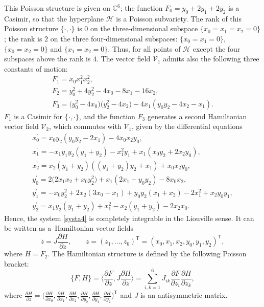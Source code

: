 \documentclass[pdftex]{sigma}
\numberwithin{equation}{section}
\begin{document}
This Poisson structure is given on $\mathbb{C}^6$; the function
$F_0=y_0 + 2y_1 + 2y_2$ is a Casimir, so that the hyperplane
$\mathcal{H}$ is a Poisson subvariety. The rank of this Poisson
structure $\{\cdot,\cdot\}$ is $0$ on the three-dimensional
subspace $\{x_0 = x_1 = x_2 = 0\}$; the rank is $2$ on the three
four-dimensional subspaces: $\{x_0 = x_1 = 0\}$, $\{x_0 = x_2 =
0\}$ and $\{x_1 = x_2 = 0\}$. Thus, for all points of
$\mathcal{H}$ except the four subspaces above the rank is $4$.
The vector field $\mathcal{V}_1$ admits also the following three
constants of motion:
\begin{gather}
 F_1=x_0x_1^2x_2^2, \nonumber\\
 F_2=y_0^2 + 4y_2^2-4x_0-8x_1-16x_2, \nonumber\\
 F_3= \bigl(y_0^2-4x_0\bigr)\bigl(y_2^2-4x_2\bigr)-4x_1(y_0y_2-4x_2-x_1).\label{invar1a4}
\end{gather}
$F_1$ is a Casimir for $\{\cdot,\cdot\}$, and the function
$F_3$ generates a second Hamiltonian vector field
$\mathcal{V}_2$, which commutes with $\mathcal{V}_1$, given by
the differential equations
\begin{gather}
x_0^{\prime}=x_0y_2(y_0y_2-2x_1)-4x_0x_2y_0, \nonumber\\
x_1^{\prime}=-x_1y_1y_2(y_1+y_2) - x_1^2y_1+x_1(x_0y_2+2x_2y_0), \nonumber\\
x_2^{\prime}=x_2(y_1+y_2)((y_1+y_2)y_2+x_1)+x_0x_2y_0, \nonumber\\
y_0^{\prime}=2\bigl(2x_1x_2+x_0y_2^2\bigr)+ x_1(2x_1-y_0y_2)-8x_0x_2, \nonumber\\
y_1^{\prime}=-x_0y_2^2+2x_2 ( 3x_0-x_1 ) +y_0y_2 (
x_1+x_2 )-2x_1^2+x_2y_0y_1, \nonumber\\
y_2^{\prime}=x_1y_2( y_1+y_2)+x_1^2-x_2( y_1+y_2)
-2x_2x_0. \label{syst3}
\end{gather}
Hence, the system \eqref{systa4} is completely integrable in the
Liouville sense. It can be written as a~Hamiltonian vector fields
\[\dot{z}=J\frac{\partial H}{\partial z},\qquad z=(z_1,\dots,z_6)^{\mathsf{T}}=( x_0
, x_1, x_2, y_0, y_1, y_2 )^{\mathsf{T}},\]
where $H=F_2$. The
Hamiltonian structure is defined by the following Poisson bracket:
\[ \{F,H\}=\biggl\langle\frac{\partial F}{\partial z}, J\frac{\partial H}
{\partial z}\biggr\rangle=\displaystyle\sum_{i,k=1}^6
J_{ik}\frac{\partial F}{\partial z_i}\frac{\partial H}{\partial
z_k},
\] where $\frac{\partial H}{\partial z}=\bigl(\frac{\partial
H}{\partial x_0},\frac{\partial H}{\partial x_1},\frac{\partial
H}{\partial x_2},\frac{\partial H}{\partial y_0},\frac{\partial
H}{\partial y_1},\frac{\partial H}{\partial y_2}\bigr)^{\mathsf{T}}$ and
$J$ is an
antisymmetric matrix.
\end{document}

